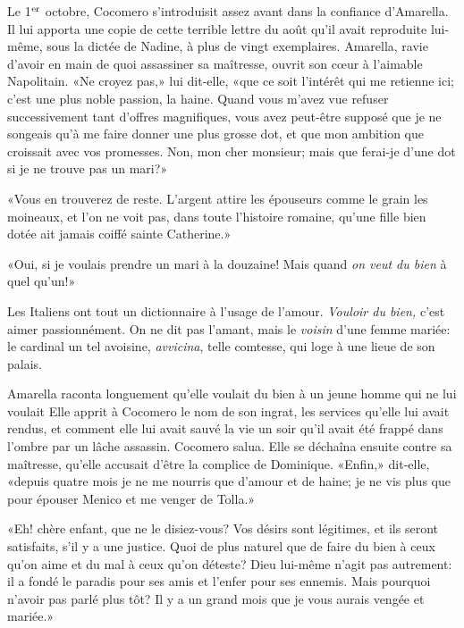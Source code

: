 
Le 1$\textsuperscript{er}$ octobre, Cocomero s'introduisit assez avant dans la confiance d'Amarella. Il lui apporta une copie de cette terrible lettre du  août qu'il avait reproduite lui-même, sous la dictée de Nadine, à plus de vingt exemplaires. Amarella, ravie d'avoir en main de quoi assassiner sa maîtresse, ouvrit son c\oe{}ur à l'aimable Napolitain. «Ne croyez pas,» lui dit-elle, «que ce soit l'intérêt qui me retienne ici; c'est une plus noble passion, la haine. Quand vous m'avez vue refuser successivement tant d'offres magnifiques, vous avez peut-être supposé que je ne songeais qu'à me faire donner une plus grosse dot, et que mon ambition que croissait avec vos promesses. Non, mon cher monsieur; mais que ferai-je d'une dot si je ne trouve pas un mari?»

«Vous en trouverez de reste. L'argent attire les épouseurs comme le grain les moineaux, et l'on ne voit pas, dans toute l'histoire romaine, qu'une fille bien dotée ait jamais coiffé sainte Catherine.»

«Oui, si je voulais prendre un mari à la douzaine! Mais quand \emph{on veut du bien} à quel qu'un!»

Les Italiens ont tout un dictionnaire à l'usage de l'amour. \emph{Vouloir du bien,} c'est aimer passionnément. On ne dit pas l'amant, mais le \emph{voisin} d'une femme mariée: le cardinal un tel avoisine, \emph{avvicina}, telle comtesse, qui loge à une lieue de son palais.

Amarella raconta longuement qu'elle voulait du bien à un jeune homme qui ne lui voulait Elle apprit à Cocomero le nom de son ingrat, les services qu'elle lui avait rendus, et comment elle lui avait sauvé la vie un soir qu'il avait été frappé dans l'ombre par un lâche assassin. Cocomero salua. Elle se déchaîna ensuite contre sa maîtresse, qu'elle accusait d'être la complice de Dominique. «Enfin,» dit-elle, «depuis quatre mois je ne me nourris que d'amour et de haine; je ne vis plus que pour épouser Menico et me venger de Tolla.»

«Eh! chère enfant, que ne le disiez-vous? Vos désirs sont légitimes, et ils seront satisfaits, s'il y a une justice. Quoi de plus naturel que de faire du bien à ceux qu'on aime et du mal à ceux qu'on déteste? Dieu lui-même n'agit pas autrement: il a fondé le paradis pour ses amis et l'enfer pour ses ennemis. Mais pourquoi n'avoir pas parlé plus tôt? Il y a un grand mois que je vous aurais vengée et mariée.»

